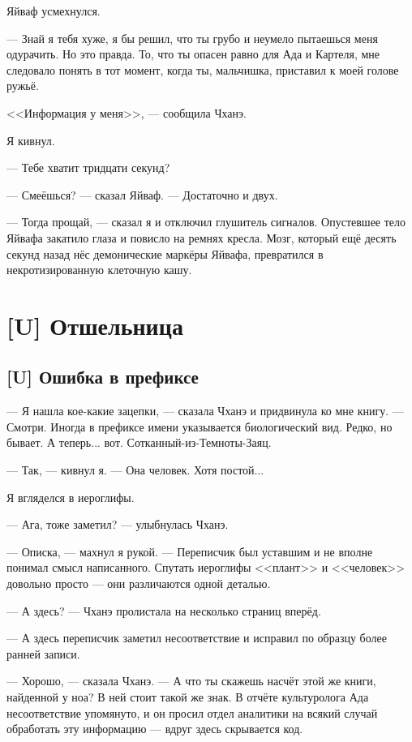 Яйваф усмехнулся.

--- Знай я тебя хуже, я бы решил, что ты грубо и неумело пытаешься меня одурачить.
Но это правда.
То, что ты опасен равно для Ада и Картеля, мне следовало понять в тот момент, когда ты, мальчишка, приставил к моей голове ружьё.

<<Информация у меня>>, --- сообщила Чханэ.

Я кивнул.

--- Тебе хватит тридцати секунд?

--- Смеёшься? --- сказал Яйваф.
--- Достаточно и двух.

--- Тогда прощай, --- сказал я и отключил глушитель сигналов.
Опустевшее тело Яйвафа закатило глаза и повисло на ремнях кресла.
Мозг, который ещё десять секунд назад нёс демонические маркёры Яйвафа, превратился в некротизированную клеточную кашу.

\chapter{[U] Отшельница}

\section{[U] Ошибка в префиксе}

\textspace

--- Я нашла кое-какие зацепки, --- сказала Чханэ и придвинула ко мне книгу.
--- Смотри.
Иногда в префиксе имени указывается биологический вид.
Редко, но бывает.
А теперь... вот.
Сотканный-из-Темноты-Заяц.

--- Так, --- кивнул я.
--- Она человек.
Хотя постой...

Я вгляделся в иероглифы.

--- Ага, тоже заметил? --- улыбнулась Чханэ.

--- Описка, --- махнул я рукой.
--- Переписчик был уставшим и не вполне понимал смысл написанного.
Спутать иероглифы <<плант>> и <<человек>> довольно просто --- они различаются одной деталью.

--- А здесь? --- Чханэ пролистала на несколько страниц вперёд.

--- А здесь переписчик заметил несоответствие и исправил по образцу более ранней записи.

--- Хорошо, --- сказала Чханэ.
--- А что ты скажешь насчёт этой же книги, найденной у ноа?
В ней стоит такой же знак.
В отчёте культуролога Ада несоответствие упомянуто, и он просил отдел аналитики на всякий случай обработать эту информацию --- вдруг здесь скрывается код.

